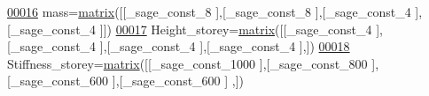 \begin{DoxyCode}
\hypertarget{input_8sage_8py_source_l00016}{}\hyperlink{namespaceinput_af91e2c1a9ecd07a9c8dcf3a5fc8b2b60}{00016} mass=\hyperlink{namespacecivilsage_1_1views_a8b58c93a9c82e84143c43dafaa744a4b}{matrix}([[\_sage\_const\_8 ],[\_sage\_const\_8 ],[\_sage\_const\_4 ],[\_sage\_const\_4 ]])
\hypertarget{input_8sage_8py_source_l00017}{}\hyperlink{namespaceinput_a01ad5b8730285b6aaebb2bc3f3fc0894}{00017} Height\_storey=\hyperlink{namespacecivilsage_1_1views_a8b58c93a9c82e84143c43dafaa744a4b}{matrix}([[\_sage\_const\_4 ],[\_sage\_const\_4 ],[\_sage\_const\_4 ],[\_sage\_const\_4 ],])
\hypertarget{input_8sage_8py_source_l00018}{}\hyperlink{namespaceinput_a3853184afbe677b2a218690766c4f5e4}{00018} Stiffness\_storey=\hyperlink{namespacecivilsage_1_1views_a8b58c93a9c82e84143c43dafaa744a4b}{matrix}([[\_sage\_const\_1000 ],[\_sage\_const\_800 ],[\_sage\_const\_600 ],[\_sage\_const\_600 ]
      ,])
\end{DoxyCode}
